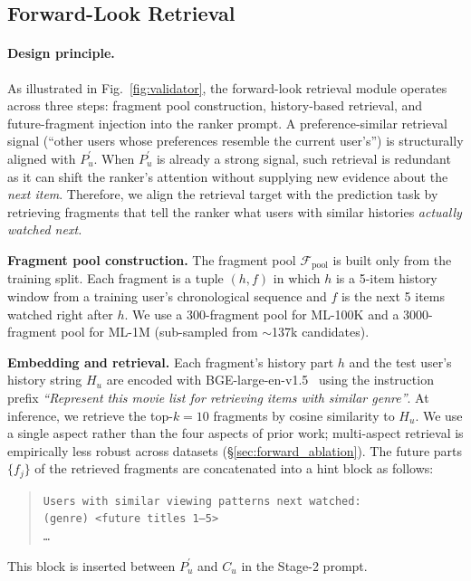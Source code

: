 \documentclass[11pt]{article}
\begin{document}
\subsection{Forward-Look Retrieval}
\label{sec:forward}
\paragraph{Design principle.}
As illustrated in Fig.~\ref{fig:validator}, the forward-look retrieval module operates across three steps: fragment pool construction, history-based retrieval, and future-fragment injection into the ranker prompt. A preference-similar retrieval signal (``other users whose preferences resemble the current user's'') is structurally aligned with $P_u^{'}$. When $P_u^{'}$ is already a strong signal, such retrieval is redundant as it can shift the ranker's attention without supplying new evidence about the \emph{next item}. Therefore, we align the retrieval target with the prediction task by retrieving fragments that tell the ranker what users with similar histories \emph{actually watched next.}

\textbf{Fragment pool construction.}
The fragment pool $\mathcal{F}_\text{pool}$ is built only from the training split. Each fragment is a tuple $(h, f)$ in which $h$ is a 5-item history window from a training user's chronological sequence and $f$ is the next 5 items watched right after $h$. We use a 300-fragment pool for ML-100K and a 3000-fragment pool for ML-1M (sub-sampled from $\sim$137k candidates).

\textbf{Embedding and retrieval.}
Each fragment's history part $h$ and the test user's history string $H_u$ are encoded with BGE-large-en-v1.5~\citep{xiao2023bge} using the instruction prefix \textit{``Represent this movie list for retrieving items with similar genre''}. At inference, we retrieve the top-$k{=}10$ fragments by cosine similarity to $H_u$. We use a single aspect rather than the four aspects of prior work; multi-aspect retrieval is empirically less robust across datasets (\S\ref{sec:forward_ablation}). The future parts $\{f_j\}$ of the retrieved fragments are concatenated into a hint block as follows:
\begin{quote}
\small
\texttt{Users with similar viewing patterns next watched:\\
\hphantom{xx}(genre) <future titles 1--5>\\
\hphantom{xx}\ldots}
\end{quote}
This block is inserted between $P_u^{'}$ and $C_u$ in the Stage-2 prompt.
\end{document}
